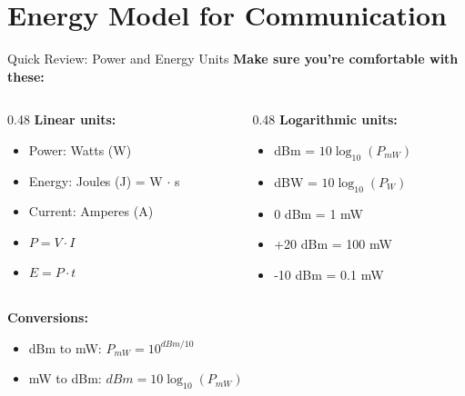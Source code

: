 \documentclass[aspectratio=169,11pt]{beamer}
\begin{document}
\section{Energy Model for Communication}

\begin{frame}{Quick Review: Power and Energy Units}
    \textbf{Make sure you're comfortable with these:}
    
    \vspace{0.3cm}
    \begin{columns}[T]
        \begin{column}{0.48\textwidth}
            \textbf{Linear units:}
            \begin{itemize}
                \item Power: Watts (W)
                \item Energy: Joules (J) = W $\cdot$ s
                \item Current: Amperes (A)
                \item $P = V \cdot I$
                \item $E = P \cdot t$
            \end{itemize}
        \end{column}
        \begin{column}{0.48\textwidth}
            \textbf{Logarithmic units:}
            \begin{itemize}
                \item dBm = $10 \log_{10}(P_{mW})$
                \item dBW = $10 \log_{10}(P_{W})$
                \item 0 dBm = 1 mW
                \item +20 dBm = 100 mW
                \item -10 dBm = 0.1 mW
            \end{itemize}
        \end{column}
    \end{columns}
    
    \vspace{0.3cm}
    \textbf{Conversions:}
    \begin{itemize}
        \item dBm to mW: $P_{mW} = 10^{dBm/10}$
        \item mW to dBm: $dBm = 10 \log_{10}(P_{mW})$
    \end{itemize}
\end{frame}
\end{document}
